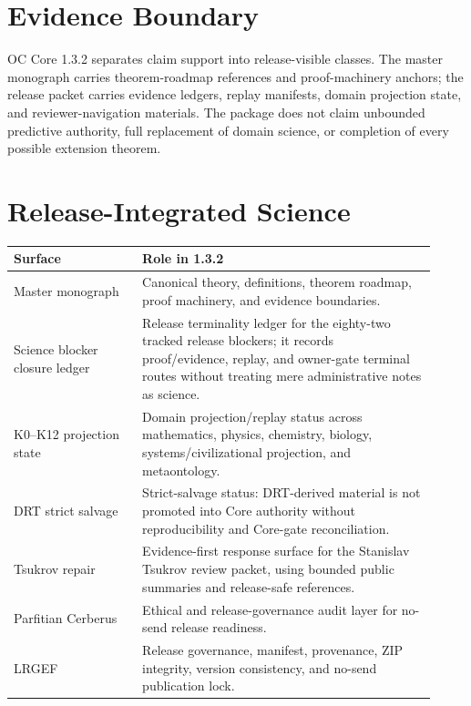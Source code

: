 \documentclass[11pt,a4paper]{article}
\begin{document}
\section*{Evidence Boundary}
OC Core 1.3.2 separates claim support into release-visible classes. The master monograph carries theorem-roadmap references and proof-machinery anchors; the release packet carries evidence ledgers, replay manifests, domain projection state, and reviewer-navigation materials. The package does not claim unbounded predictive authority, full replacement of domain science, or completion of every possible extension theorem.

\section*{Release-Integrated Science}
\begin{longtable}{>{\raggedright\arraybackslash}p{0.28\linewidth}>{\raggedright\arraybackslash}p{0.64\linewidth}}
\textbf{Surface} & \textbf{Role in 1.3.2}\\
\hline
Master monograph & Canonical theory, definitions, theorem roadmap, proof machinery, and evidence boundaries.\\
Science blocker closure ledger & Release terminality ledger for the eighty-two tracked release blockers; it records proof/evidence, replay, and owner-gate terminal routes without treating mere administrative notes as science.\\
K0--K12 projection state & Domain projection/replay status across mathematics, physics, chemistry, biology, systems/civilizational projection, and metaontology.\\
DRT strict salvage & Strict-salvage status: DRT-derived material is not promoted into Core authority without reproducibility and Core-gate reconciliation.\\
Tsukrov repair & Evidence-first response surface for the Stanislav Tsukrov review packet, using bounded public summaries and release-safe references.\\
Parfitian Cerberus & Ethical and release-governance audit layer for no-send release readiness.\\
LRGEF & Release governance, manifest, provenance, ZIP integrity, version consistency, and no-send publication lock.\\
\end{longtable}
\end{document}

